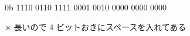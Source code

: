\begin{center}
0b 1110 0110 1111 0001 0010 0000 0000 0000

\noindent ※ 長いので 4 ビットおきにスペースを入れてある
\end{center}
